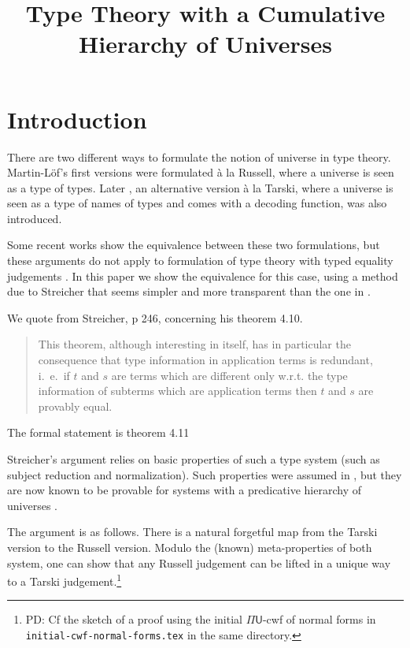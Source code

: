 \documentclass[11pt,a4paper]{article}
\theoremstyle{definition}
\def\UU{\mathsf{U}}
\begin{document}
\title{Type Theory with a Cumulative Hierarchy of Universes}

\author{}
\date{}
\maketitle


\section{Introduction}\label{sec:intros}

 There are two different ways to formulate the notion of universe in type theory. Martin-Löf's first versions \cite{martinlof:72,martinlof:predicative,martinlof:hannover,martinlof:padova} were formulated \`a la Russell, where a universe is seen as a type of types. Later \cite{martinlof:padova}, an alternative version \`a la Tarski, where a universe is seen as a type of names of types and comes with a decoding function, was also introduced.
 
Some recent works \cite{Assaf14,Thire20} show the equivalence between these two formulations, but these arguments do not apply to formulation of type theory with typed equality judgements \cite{martinlof:hannover,martinlof:padova}. In this paper we show the equivalence for this case, using a method due to Streicher  \cite{Streicher:semtt} that seems simpler
and more transparent than the one in \cite{Assaf14,Thire20}.

We quote from Streicher, p 246, concerning his theorem 4.10.
\begin{quotation}
This theorem, although interesting in itself, has in particular the consequence that type information in application terms is redundant, i.~e.~if $t$ and $s$ are terms which are different only w.r.t. the type information of subterms which are application terms then $t$ and $s$ are provably equal.
\end{quotation}
The formal statement is theorem 4.11

Streicher's argument relies
on  basic properties of such a type system (such as subject reduction and normalization). Such properties were assumed
in \cite{Streicher:semtt}, but they are now known to be provable
for systems with a predicative hierarchy of universes \cite{coquand:sophia,abel:wroclaw,coq18}.

The argument is as follows. There is a natural forgetful map from the Tarski version to the Russell version. Modulo the (known) meta-properties of both system, one can show that any Russell judgement can be lifted in a unique way to a Tarski judgement.\footnote{PD: Cf the sketch of a proof using the initial $\Pi\UU$-cwf of normal forms in {\tt initial-cwf-normal-forms.tex} in the same directory.}
\end{document}

